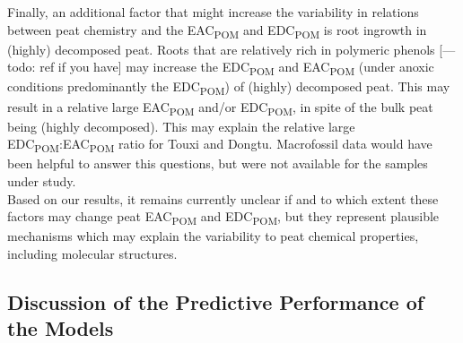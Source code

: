 \documentclass[alpha-refs, lineno]{wiley-article-rmd}
\begin{document}
Finally, an additional factor that might increase the variability in relations between peat chemistry and the EAC\textsubscript{POM} and EDC\textsubscript{POM} is root ingrowth in (highly) decomposed peat. Roots that are relatively rich in polymeric phenols \autocite{Moore.2007,Scheffer.2000} {[}--- todo: ref if you have{]} may increase the EDC\textsubscript{POM} and EAC\textsubscript{POM} (under anoxic conditions predominantly the EDC\textsubscript{POM}) of (highly) decomposed peat. This may result in a relative large EAC\textsubscript{POM} and/or EDC\textsubscript{POM}, in spite of the bulk peat being (highly decomposed). This may explain the relative large EDC\textsubscript{POM}:EAC\textsubscript{POM} ratio for Touxi and Dongtu. Macrofossil data would have been helpful to answer this questions, but were not available for the samples under study.\\
Based on our results, it remains currently unclear if and to which extent these factors may change peat EAC\textsubscript{POM} and EDC\textsubscript{POM}, but they represent plausible mechanisms which may explain the variability to peat chemical properties, including molecular structures.

\hypertarget{discussion-of-the-predictive-performance-of-the-models}{%
\subsection{Discussion of the Predictive Performance of the Models}\label{discussion-of-the-predictive-performance-of-the-models}}
\end{document}
